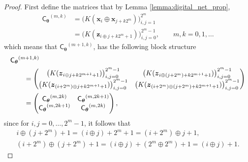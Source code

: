 \documentclass[graybox,footinfo]{svmult}
\newcommand{\bm}[1]{\boldsymbol{#1}}
\newcommand{\vtheta}{{\bm{\theta}}}
\newcommand{\vx}{\bm{x}}
\newcommand{\vz}{\bm{z}}
\newcommand{\mCtheta}{{\mathsf{C}_{\vtheta}}}
\begin{document}
\begin{proof}
    First define the matrices that by Lemma \ref{lemma:digital_net_prop}, 
    \begin{align*}
    \mCtheta^{(m,k)} & = \bigl(K(\vx_i \oplus \vx_{j + k2^m} )\bigr)_{i,j=1}^{2^m} \\
    & = \bigl(K(\vz_{i\oplus j+ k 2^m + 1})\bigr)_{i,j=0}^{2^m-1}, \qquad m,k  = 0, 1, \ldots
    \end{align*}
    which means that $\mCtheta^{(m+1,k)}$, has the following block structure
    \begin{align} \nonumber
    \MoveEqLeft{\mCtheta^{(m+1,k)}} \\
    \nonumber
    & = 
    \begin{pmatrix} 
    \bigl(K(\vz_{i\oplus j+ k2^{m+1} + 1})\bigr)_{i,j=0}^{2^m-1} &
    \bigl(K(\vz_{i\oplus (j+2^m)+ k2^{m+1} +1})\bigr)_{i,j=0}^{2^m-1} \\
    \bigl(K(\vz_{(i + 2^m) \oplus j + k2^{m+1}+1})\bigr)_{i,j=0}^{2^m-1} &
    \bigl(K(\vz_{(i + 2^m) \oplus (j+2^m) + k2^{m+1} +1})\bigr)_{i,j=0}^{2^m-1}
    \end{pmatrix} \\
    & = \begin{pmatrix} \mCtheta^{(m,2k)} & \mCtheta^{(m,2k+1)} \\
    \mCtheta^{(m,2k+1)} & \mCtheta^{(m,2k)}
    \end{pmatrix} , \label{eq:cblock}
    \end{align}
    since for $i,j = 0, \ldots, 2^m-1$, it follows that 
    \begin{gather*}
        i\oplus (j+2^m) +1 = (i\oplus j) + 2^m +1 = (i + 2^m) \oplus j +1 ,\\
        (i + 2^m) \oplus (j+2^m) +1 = (i\oplus j) + (2^m \oplus 2^m) +1= (i\oplus j) +1.
    \end{gather*}
    

\end{proof}
\end{document}
